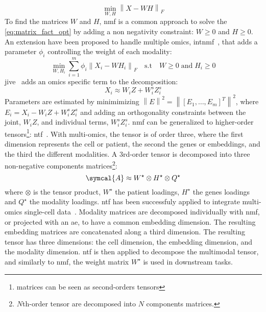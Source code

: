 \documentclass[../main.tex]{subfiles}
\begin{document}
	\begin{equation}
		\min_{W,H} {\left\| X - WH \right\|}_{F} \label{eq:matrix_fact_opt}
	\end{equation}
	To find the matrices \(W\) and \(H\), \gls{nmf} is a common approach to solve the \cref{eq:matrix_fact_opt} by adding a non negativity constraint: \(W \geq 0\) and \(H \geq 0\).
	An extension have been proposed to handle multiple omics, \gls{intnmf}~\cite{Chalise2017}, that adds a parameter \(\phi_{i}\) controlling the weight of each modality:
	\begin{equation}
		\min_{W,H_i} \sum_{i=1}^{m} \phi_{i}{\left\| X_i - WH_i \right\|}_{F} \quad \text{s.t} \quad W \geq 0 \;\text{and}\; H_i \geq 0
	\end{equation}
	\Gls{jive}~\cite{Lock2013} adds an omics specific term to the decomposition:
	\begin{equation}
		X_i \approx W_i Z + W_i^s Z_i^s
	\end{equation}
	Parameters are estimated by minimimizing \({\left\|E\right\|}^2 = {\left\|{\left[E_1, \ldots, E_m \right]}^T\right\|}^2\), where \(E_i = X_i - W_i Z + W_i^s Z_i^s\) and adding an orthogonality constraints between the joint, \(W_i Z\), and individual terms, \( W_i^s Z_i^s\).
	\Gls{nmf} can be generalized to higher-order tensors\footnote{matrices can be seen as second-orders tensors}: \gls{ntf}~\cite{Cichocki2009}.
	With multi-omics, the tensor is of order three, where the first dimension represents the cell or patient, the second the genes or embeddings, and the third the different modalities.
	A 3rd-order tensor is decomposed into three non-negative components matrices\footnote{\(N\)th-order tensor are decomposed into \(N\) components matrices.}:
	\begin{equation}
		\symcal{A} \approx W^{\star}\otimes H^{\star} \otimes Q^{\star}
	\end{equation}
	where \(\otimes\) is the tensor product, \(W^{\star}\) the patient loadings, \(H^{\star}\) the genes loadings and \(Q^{\star}\) the modality loadings.
	\Gls{ntf} has been successfuly applied to integrate multi-omics single-cell data~\cite{Fogel2024}.
	Modality matrices are decomposed individually with \gls{nmf}, or projected with an \gls{ae}, to have a common embedding dimension.
	The resulting embedding matrices are concatenated along a third dimension.
	The resulting tensor has three dimensions: the cell dimension, the embedding dimension, and the modality dimension.
	\Gls{ntf} is then applied to decompose the multimodal tensor, and similarly to \gls{nmf}, the weight matrix \(W^{\star}\) is used in downstream tasks.
\end{document}
